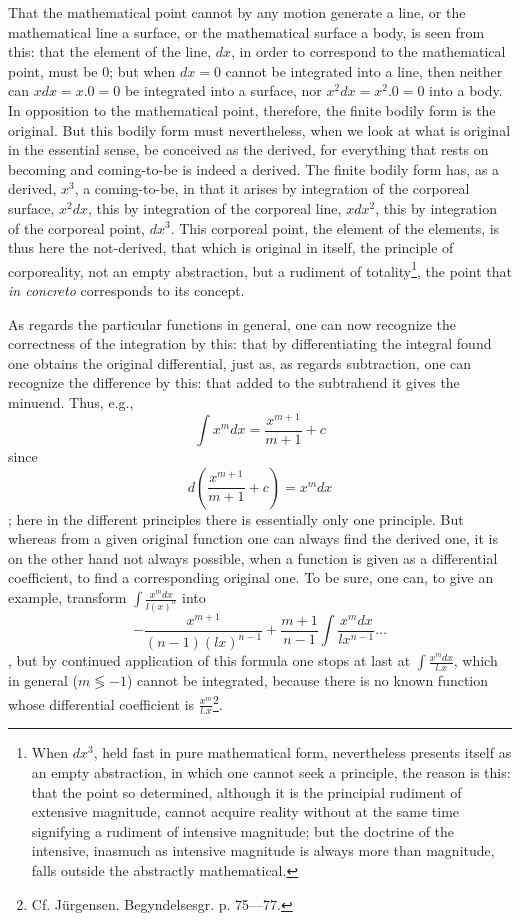 \documentclass[12pt,a4paper,openany]{book}
\newcommand{\opage}[1]{\marginnote{\footnotesize\textit{[#1]}}}
\begin{document}
\setcounter{footnote}{0}%
\opage{109}That the mathematical point cannot by any motion
generate a line, or the mathematical line a
surface, or the mathematical surface a body, is seen from this:
that the element of the line, $dx$, in order to correspond to the mathematical
point, must be $0$; but when $dx=0$ cannot be integrated
into a line, then neither can $xdx=x.0=0$ be integrated into a
surface, nor $x^{2}dx=x^{2}.0=0$ into a body.
In opposition to the mathematical point, therefore, the
finite bodily form is the original. But this bodily form
must nevertheless, when we look at what is original in the essential
sense, be conceived as the derived,
for everything that rests on becoming and coming-to-be
is indeed a derived. The finite bodily form has, as a derived, $x^{3}$, a coming-to-be, in that it arises by integration
of the corporeal surface, $x^{2}dx$, this by integration
\setcounter{footnote}{0}%
\opage{110}of the corporeal line, $xdx^{2}$, this by integration of the
corporeal point, $dx^{3}$. This corporeal point, the element of the elements, is thus here the not-derived, that which is original in itself,
the principle of corporeality, not an empty abstraction,
but a rudiment of totality\footnote[1]{When $dx^{3}$, held fast in pure mathematical form, nevertheless presents itself as an empty abstraction, in which one cannot seek a principle, the reason is this: that the point so determined, although it is the principial rudiment of extensive magnitude, cannot acquire reality without at the same time signifying a rudiment of intensive magnitude; but the doctrine of the intensive, inasmuch as intensive magnitude is always more than magnitude, falls outside the abstractly mathematical.}, the point that \textit{in concreto}
corresponds to its concept.

As regards the particular functions in general,
one can now recognize the correctness of the integration by this: that
by differentiating the integral found one obtains the
original differential, just as, as regards subtraction,
one can recognize the difference by this: that added to the
subtrahend it gives the minuend. Thus, e.g.,
\[ \int x^{m}dx=\frac{x^{m+1}}{m+1}+c \]
since
\[ d\left(\frac{x^{m+1}}{m+1}+c\right)=x^{m}dx \]
; here in the
different principles there is essentially only one principle. But whereas
from a given original function one can always find
the derived one, it is on the other hand not always possible, when a
function is given as a differential coefficient, to find
a corresponding original one. To be sure, one can, to give
an example, transform $\int\frac{x^{m}dx}{l(x)^{n}}$ into
\[ -\frac{x^{m+1}}{(n-1)(lx)^{n-1}}+\frac{m+1}{n-1}\int\frac{x^{m}dx}{lx^{n-1}}\ldots \]
, but by continued application of this
formula one stops at last at $\int\frac{x^{m}dx}{l.x}$, which in general
\setcounter{footnote}{0}%
\opage{111}($m \lessgtr -1$) cannot be integrated, because there is
no known function whose differential coefficient is $\frac{x^{m}}{l.x}$\footnote[1]{Cf. Jürgensen. Begyndelsesgr. p. 75—77.}.
\end{document}
